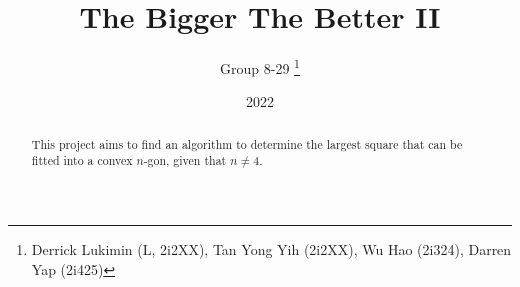 \documentclass[11pt]{article}
\title{The Bigger The Better II}
\author{Group 8-29 \thanks{Derrick Lukimin (L, 2i2XX), Tan Yong Yih (2i2XX), Wu Hao (2i324), Darren Yap (2i425)}}
\date{2022}
\begin{document}
\onehalfspacing
\maketitle

\begin{abstract}
  This project aims to find an algorithm to determine
  the largest square that can be fitted into a convex
  $n$-gon, given that $n \neq 4$.
\end{abstract}
\end{document}
